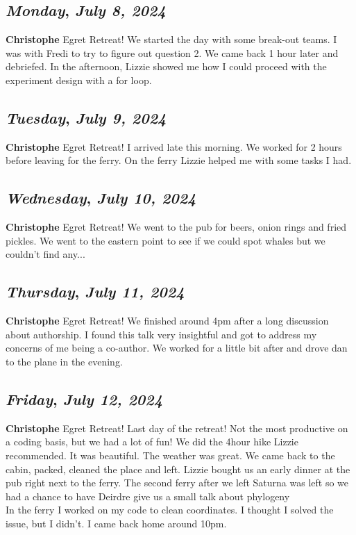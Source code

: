 \def\day{\textit{July 8, 2024}}
\def\weekday{\textit{Monday}}
\subsection*{\weekday, \day}
\textbf {Christophe}
Egret Retreat!
We started the day with some break-out teams. I was with Fredi to try to figure out question 2. We came back 1 hour later and debriefed. In the afternoon, Lizzie showed me how I could proceed with the experiment design with a for loop. 

\def\day{\textit{July 9, 2024}}
\def\weekday{\textit{Tuesday}}
\subsection*{\weekday, \day}
\textbf {Christophe}
Egret Retreat!
I arrived late this morning. We worked for 2 hours before leaving for the ferry. On the ferry Lizzie helped me with some tasks I had.

\def\day{\textit{July 10, 2024}}
\def\weekday{\textit{Wednesday}}
\subsection*{\weekday, \day}
\textbf {Christophe}
Egret Retreat!
We went to the pub for beers, onion rings and fried pickles. We went to the eastern point to see if we could spot whales but we couldn't find any...

\def\day{\textit{July 11, 2024}}
\def\weekday{\textit{Thursday}}
\subsection*{\weekday, \day}
\textbf {Christophe}
Egret Retreat!
We finished around 4pm after a long discussion about authorship. I found this talk very insightful and got to address my concerns of me being a co-author. We worked for a little bit after and drove dan to the plane in the evening.

\def\day{\textit{July 12, 2024}}
\def\weekday{\textit{Friday}}
\subsection*{\weekday, \day}
\textbf {Christophe}
Egret Retreat!
Last day of the retreat! Not the most productive on a coding basis, but we had a lot of fun! We did the 4hour hike Lizzie recommended. It was beautiful. The weather was great. 
We came back to the cabin, packed, cleaned the place and left. Lizzie bought us an early dinner at the pub right next to the ferry. The second ferry after we left Saturna was left so we had a chance to have Deirdre give us a small talk about phylogeny\\
In the ferry I worked on my code to clean coordinates. I thought I solved the issue, but I didn't. I came back home around 10pm.

